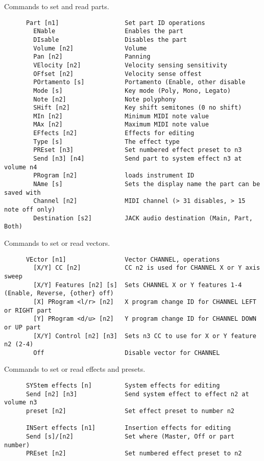    Commands to set and read parts.

\begin{verbatim}
      Part [n1]                  Set part ID operations
        ENable                   Enables the part
        DIsable                  Disables the part
        Volume [n2]              Volume
        Pan [n2]                 Panning
        VElocity [n2]            Velocity sensing sensitivity
        OFfset [n2]              Velocity sense offest
        POrtamento [s]           Portamento (Enable, other disable
        Mode [s]                 Key mode (Poly, Mono, Legato)
        Note [n2]                Note polyphony
        SHift [n2]               Key shift semitones (0 no shift)
        MIn [n2]                 Minimum MIDI note value
        MAx [n2]                 Maximum MIDI note value
        EFfects [n2]             Effects for editing
        Type [s]                 The effect type
        PREset [n3]              Set numbered effect preset to n3
        Send [n3] [n4]           Send part to system effect n3 at volume n4
        PRogram [n2]             loads instrument ID
        NAme [s]                 Sets the display name the part can be saved with
        Channel [n2]             MIDI channel (> 31 disables, > 15 note off only)
        Destination [s2]         JACK audio destination (Main, Part, Both)
\end{verbatim}

   Commands to set or read vectors.

\begin{verbatim}
      VEctor [n1]                Vector CHANNEL, operations
        [X/Y] CC [n2]            CC n2 is used for CHANNEL X or Y axis sweep
        [X/Y] Features [n2] [s]  Sets CHANNEL X or Y features 1-4 (Enable, Reverse, {other} off)
        [X] PRogram <l/r> [n2]   X program change ID for CHANNEL LEFT or RIGHT part
        [Y] PRogram <d/u> [n2]   Y program change ID for CHANNEL DOWN or UP part
        [X/Y] Control [n2] [n3]  Sets n3 CC to use for X or Y feature n2 (2-4)
        Off                      Disable vector for CHANNEL
\end{verbatim}

   Commands to set or read effects and presets.

\begin{verbatim}
      SYStem effects [n]         System effects for editing
      Send [n2] [n3]             Send system effect to effect n2 at volume n3
      preset [n2]                Set effect preset to number n2

      INSert effects [n1]        Insertion effects for editing
      Send [s]/[n2]              Set where (Master, Off or part number)
      PREset [n2]                Set numbered effect preset to n2
\end{verbatim}

